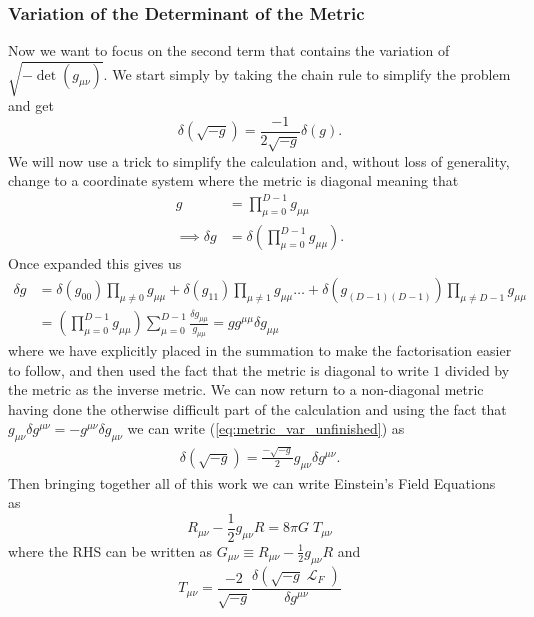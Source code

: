 \documentclass[12pt]{article}
\numberwithin{equation}{section}
\DeclareMathOperator{\Lagr}{\mathcal{L}}
\numberwithin{figure}{section}
\begin{document}
\subsubsection{Variation of the Determinant of the Metric} %
\label{subsub:variation_of_the_determinant_of_the_metric}
Now we want to focus on the second term that contains the variation of $\sqrt{-\det(g_{\mu\nu})}$. We start simply by taking the chain rule to simplify the problem and get
\begin{equation}
	\delta(\sqrt{-g}) = \frac{-1}{2\sqrt{-g}}\delta(g). \label{eq:metric_var_unfinished}
\end{equation}
We will now use a trick to simplify the calculation and, without loss of generality, change to a coordinate system where the metric is diagonal meaning that 
\begin{align}
	g &= \prod_{\mu=0}^{D-1} g_{\mu\mu}\\
	\implies \delta g & = \delta(\prod_{\mu=0}^{D-1} g_{\mu\mu}).
\end{align}
Once expanded this gives us
\begin{align}
	\delta g & = \delta(g_{00})\prod_{\mu \neq 0 }g_{\mu\mu} + \delta(g_{11})\prod_{\mu\neq 1} g_{\mu\mu} \dots + \delta(g_{(D-1)(D-1)})\prod_{\mu\neq D-1} g_{\mu\mu}\\
	&= (\prod_{\mu=0}^{D-1} g_{\mu\mu})\sum_{\mu=0}^{D-1} \frac{\delta g_{\mu\mu}}{g_{\mu\mu}} = g g^{\mu\mu} \delta g_{\mu\mu}
\end{align}
where we have explicitly placed in the summation to make the factorisation easier to follow, and then used the fact that the metric is diagonal to write $1$ divided by the metric as the inverse metric. We can now return to a non-diagonal metric having done the otherwise difficult part of the calculation and using the fact that $g_{\mu\nu}\delta g^{\mu\nu} = - g^{\mu\nu} \delta g_{\mu\nu}$ we can write (\ref{eq:metric_var_unfinished}) as
\begin{align}
	\delta(\sqrt{-g}) = \frac{-\sqrt{-g}}{2}g_{\mu\nu}\delta g^{\mu\nu}.
\end{align}
Then bringing together all of this work we can write Einstein's Field Equations as
\begin{equation}
	R_{\mu\nu} - \frac{1}{2}g_{\mu\nu}R = 8\pi G\; T_{\mu\nu} \label{eq:efe}
\end{equation}
where the RHS can be written as $G_{\mu\nu}\equiv R_{\mu\nu} - \frac{1}{2}g_{\mu\nu}R$ and
\begin{equation}
	T_{\mu\nu}=\frac{-2}{\sqrt{-g}}\frac{\delta(\sqrt{-g}\Lagr_F)}{\delta g^{\mu\nu}}
\end{equation} 
\end{document}
